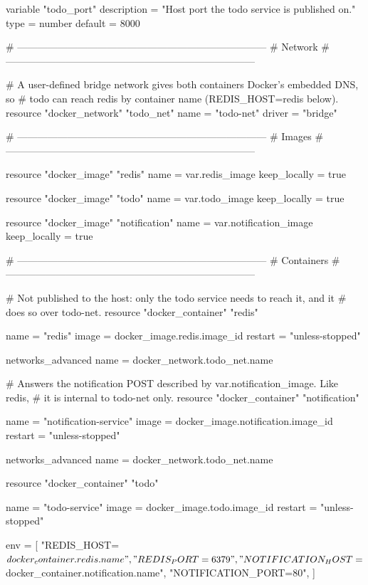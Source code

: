 \documentclass[a4paper, 10pt]{article}
\begin{document}
\begin{solution}
\begin{codingbox*}[language=HCL]
variable "todo_port" {
  description = "Host port the todo service is published on."
  type        = number
  default     = 8000
}

# ---------------------------------------------------------------------------
# Network
# ---------------------------------------------------------------------------

# A user-defined bridge network gives both containers Docker's embedded DNS, so
# todo can reach redis by container name (REDIS_HOST=redis below).
resource "docker_network" "todo_net" {
  name   = "todo-net"
  driver = "bridge"
}

# ---------------------------------------------------------------------------
# Images
# ---------------------------------------------------------------------------

resource "docker_image" "redis" {
  name         = var.redis_image
  keep_locally = true
}

resource "docker_image" "todo" {
  name         = var.todo_image
  keep_locally = true
}

resource "docker_image" "notification" {
  name         = var.notification_image
  keep_locally = true
}

# ---------------------------------------------------------------------------
# Containers
# ---------------------------------------------------------------------------

# Not published to the host: only the todo service needs to reach it, and it
# does so over todo-net.
resource "docker_container" "redis" {
  name    = "redis"
  image   = docker_image.redis.image_id
  restart = "unless-stopped"

  networks_advanced {
    name = docker_network.todo_net.name
  }
}

# Answers the notification POST described by var.notification_image. Like redis,
# it is internal to todo-net only.
resource "docker_container" "notification" {
  name    = "notification-service"
  image   = docker_image.notification.image_id
  restart = "unless-stopped"

  networks_advanced {
    name = docker_network.todo_net.name
  }
}

resource "docker_container" "todo" {
  name    = "todo-service"
  image   = docker_image.todo.image_id
  restart = "unless-stopped"

  env = [
    "REDIS_HOST=${docker_container.redis.name}",
    "REDIS_PORT=6379",
    "NOTIFICATION_HOST=${docker_container.notification.name}",
    "NOTIFICATION_PORT=80",
  ]

}
\end{codingbox*}
\end{solution}
\end{document}
